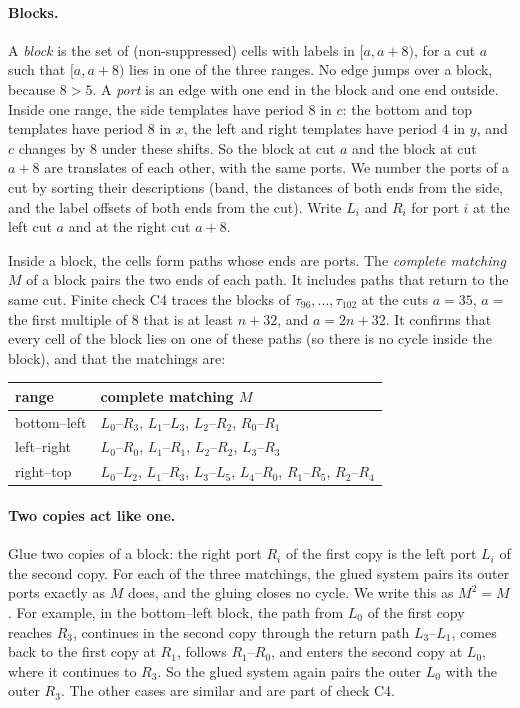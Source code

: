 \documentclass[11pt]{article}
\theoremstyle{definition}
\theoremstyle{remark}
\begin{document}
\paragraph{Blocks.}
A \emph{block} is the set of (non-suppressed) cells with labels in $[a,a+8)$, for a cut $a$ such that $[a,a+8)$ lies in one of the three ranges.
No edge jumps over a block, because $8>5$.
A \emph{port} is an edge with one end in the block and one end outside.
Inside one range, the side templates have period $8$ in $c$: the bottom and top templates have period $8$ in $x$, the left and right templates have period $4$ in $y$, and $c$ changes by $8$ under these shifts.
So the block at cut $a$ and the block at cut $a+8$ are translates of each other, with the same ports.
We number the ports of a cut by sorting their descriptions (band, the distances of both ends from the side, and the label offsets of both ends from the cut).
Write $L_i$ and $R_i$ for port $i$ at the left cut $a$ and at the right cut $a+8$.

Inside a block, the cells form paths whose ends are ports.
The \emph{complete matching} $M$ of a block pairs the two ends of each path.
It includes paths that return to the same cut.
Finite check C4 traces the blocks of $\tau_{96},\dots,\tau_{102}$ at the cuts $a=35$, $a=$ the first multiple of $8$ that is at least $n+32$, and $a=2n+32$.
It confirms that every cell of the block lies on one of these paths (so there is no cycle inside the block), and that the matchings are:
\begin{center}
\begin{tabular}{ll}
\toprule
range & complete matching $M$\\\midrule
bottom--left & $L_0$--$R_3$, $L_1$--$L_3$, $L_2$--$R_2$, $R_0$--$R_1$\\
left--right & $L_0$--$R_0$, $L_1$--$R_1$, $L_2$--$R_2$, $L_3$--$R_3$\\
right--top & $L_0$--$L_2$, $L_1$--$R_3$, $L_3$--$L_5$, $L_4$--$R_0$, $R_1$--$R_5$, $R_2$--$R_4$\\\bottomrule
\end{tabular}
\end{center}

\paragraph{Two copies act like one.}
Glue two copies of a block: the right port $R_i$ of the first copy is the left port $L_i$ of the second copy.
For each of the three matchings, the glued system pairs its outer ports exactly as $M$ does, and the gluing closes no cycle.
We write this as $M^2=M$.
For example, in the bottom--left block, the path from $L_0$ of the first copy reaches $R_3$, continues in the second copy through the return path $L_3$--$L_1$, comes back to the first copy at $R_1$, follows $R_1$--$R_0$, and enters the second copy at $L_0$, where it continues to $R_3$.
So the glued system again pairs the outer $L_0$ with the outer $R_3$.
The other cases are similar and are part of check C4.
\end{document}
